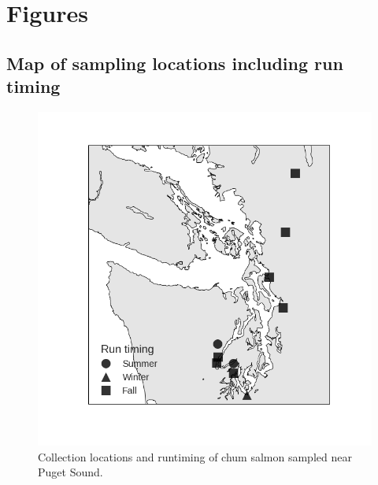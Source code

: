 \documentclass[12pt, one column]{article}
\begin{document}
% 

\listoffigures 

\listoftables

\pagebreak
\section*{Figures}
\subsection*{Map of sampling locations including run timing}
\begin{figure}[H]
\includegraphics[scale=.6]{figures/collection_map.png}
\caption[Collection locations]{Collection locations and runtiming of chum salmon sampled near Puget Sound.}
\end{figure}
\end{document}
